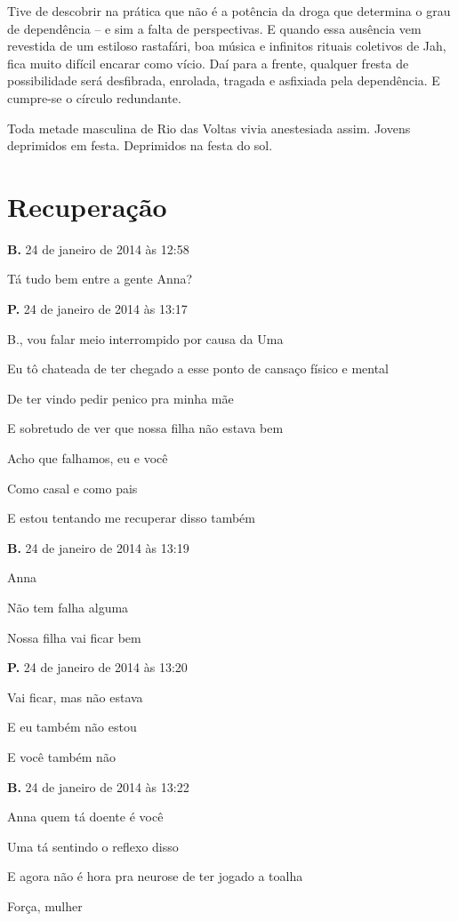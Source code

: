 Tive de descobrir na prática que não é a potência da droga que determina
o grau de dependência -- e sim a falta de perspectivas. E quando essa
ausência vem revestida de um estiloso rastafári, boa música e infinitos
rituais coletivos de Jah, fica muito difícil encarar como vício. Daí
para a frente, qualquer fresta de possibilidade será desfibrada,
enrolada, tragada e asfixiada pela dependência. E cumpre-se o círculo
redundante.

Toda metade masculina de Rio das Voltas vivia anestesiada assim. Jovens
deprimidos em festa. Deprimidos na festa do sol.

\chapter{Recuperação}


{\parindent0pt\parskip1pt\raggedright
\textbf{B.} 24 de janeiro de 2014 às 12:58

Tá tudo bem entre a gente Anna?

\textbf{P.} 24 de janeiro de 2014 às 13:17

B., vou falar meio interrompido por causa da Uma

Eu tô chateada de ter chegado a esse ponto de cansaço físico e mental

De ter vindo pedir penico pra minha mãe

E sobretudo de ver que nossa filha não estava bem

Acho que falhamos, eu e você

Como casal e como pais

E estou tentando me recuperar disso também

\textbf{B.} 24 de janeiro de 2014 às 13:19

Anna

Não tem falha alguma

Nossa filha vai ficar bem

\textbf{P.} 24 de janeiro de 2014 às 13:20

Vai ficar, mas não estava

E eu também não estou

E você também não

\textbf{B.} 24 de janeiro de 2014 às 13:22

Anna quem tá doente é você

Uma tá sentindo o reflexo disso

E agora não é hora pra neurose de ter jogado a toalha

Força, mulher
}

